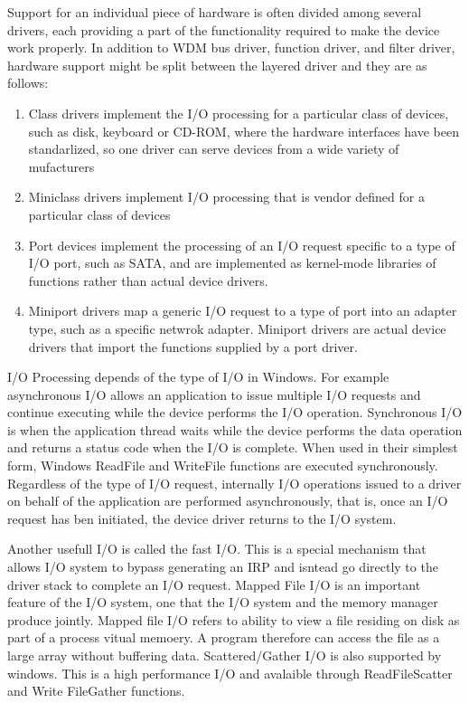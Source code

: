 \documentclass[letterpaper,10pt,draftclsnofoot,onecolumn]{IEEEtran}
\begin{document}
Support for an individual piece of hardware is often divided among several drivers, each providing a part of the functionality required to make the device work properly. In addition to WDM bus driver, function driver, and filter driver, hardware support might be split between the layered driver and they are as follows: \cite{[1]}

\begin{enumerate}
\item Class drivers implement the I/O processing for a particular class of devices, such as disk, keyboard or CD-ROM, where the hardware interfaces have been standarlized, so one driver can serve devices from a wide variety of mufacturers
\item Miniclass drivers implement I/O processing that is vendor defined for a particular class of devices
\item Port devices implement the processing of an I/O request specific to a type of I/O port, such as SATA, and are implemented as kernel-mode libraries of functions rather than actual device drivers.
\item Miniport drivers map a generic I/O request to a type of port into an adapter type, such as a specific netwrok adapter. Miniport drivers are actual device drivers that import the functions supplied by a port driver.
\end{enumerate}

I/O Processing depends of the type of I/O in Windows. For example asynchronous I/O allows an application to issue multiple I/O requests and continue executing while the device performs the I/O operation. Synchronous I/O is when the application thread waits while the device performs the data operation and returns a status code when the I/O is complete. When used in their simplest form, Windows ReadFile and WriteFile functions are executed synchronously. Regardless of the type of I/O request, internally I/O operations issued to a driver on behalf of the application are performed asynchronously, that is, once an I/O request has ben initiated, the device driver returns to the I/O system.

Another usefull I/O is called the fast I/O. This is a special mechanism that allows I/O system to bypass generating an IRP and isntead go directly to the driver stack to complete an I/O request. Mapped File I/O is an important feature of the I/O system, one that the I/O system and the memory manager produce jointly. Mapped file I/O refers to ability to view a file residing on disk as part of a process vitual memoery. A program therefore can access the file as a large array without buffering data. Scattered/Gather I/O is also supported by windows. This is a high performance I/O and avalaible through ReadFileScatter and Write FileGather functions.
\end{document}
